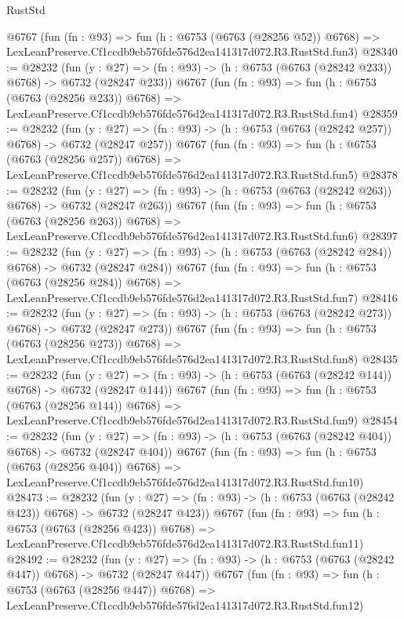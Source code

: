 \begin{lexlean}{RustStd}
\begin{coremodule}
    @6767
    (fun (fn : @93) =>
    fun (h : @6753 (@6763 (@28256 @52)) @6768) =>
    LexLeanPreserve.Cf1ccdb9eb576fde576d2ea141317d072.R3.RustStd.fun3)
@28340 := @28232
    (fun (y : @27) => (fn : @93) -> (h : @6753 (@6763 (@28242 @233)) @6768) -> @6732 (@28247 @233))
    @6767
    (fun (fn : @93) =>
    fun (h : @6753 (@6763 (@28256 @233)) @6768) =>
    LexLeanPreserve.Cf1ccdb9eb576fde576d2ea141317d072.R3.RustStd.fun4)
@28359 := @28232
    (fun (y : @27) => (fn : @93) -> (h : @6753 (@6763 (@28242 @257)) @6768) -> @6732 (@28247 @257))
    @6767
    (fun (fn : @93) =>
    fun (h : @6753 (@6763 (@28256 @257)) @6768) =>
    LexLeanPreserve.Cf1ccdb9eb576fde576d2ea141317d072.R3.RustStd.fun5)
@28378 := @28232
    (fun (y : @27) => (fn : @93) -> (h : @6753 (@6763 (@28242 @263)) @6768) -> @6732 (@28247 @263))
    @6767
    (fun (fn : @93) =>
    fun (h : @6753 (@6763 (@28256 @263)) @6768) =>
    LexLeanPreserve.Cf1ccdb9eb576fde576d2ea141317d072.R3.RustStd.fun6)
@28397 := @28232
    (fun (y : @27) => (fn : @93) -> (h : @6753 (@6763 (@28242 @284)) @6768) -> @6732 (@28247 @284))
    @6767
    (fun (fn : @93) =>
    fun (h : @6753 (@6763 (@28256 @284)) @6768) =>
    LexLeanPreserve.Cf1ccdb9eb576fde576d2ea141317d072.R3.RustStd.fun7)
@28416 := @28232
    (fun (y : @27) => (fn : @93) -> (h : @6753 (@6763 (@28242 @273)) @6768) -> @6732 (@28247 @273))
    @6767
    (fun (fn : @93) =>
    fun (h : @6753 (@6763 (@28256 @273)) @6768) =>
    LexLeanPreserve.Cf1ccdb9eb576fde576d2ea141317d072.R3.RustStd.fun8)
@28435 := @28232
    (fun (y : @27) => (fn : @93) -> (h : @6753 (@6763 (@28242 @144)) @6768) -> @6732 (@28247 @144))
    @6767
    (fun (fn : @93) =>
    fun (h : @6753 (@6763 (@28256 @144)) @6768) =>
    LexLeanPreserve.Cf1ccdb9eb576fde576d2ea141317d072.R3.RustStd.fun9)
@28454 := @28232
    (fun (y : @27) => (fn : @93) -> (h : @6753 (@6763 (@28242 @404)) @6768) -> @6732 (@28247 @404))
    @6767
    (fun (fn : @93) =>
    fun (h : @6753 (@6763 (@28256 @404)) @6768) =>
    LexLeanPreserve.Cf1ccdb9eb576fde576d2ea141317d072.R3.RustStd.fun10)
@28473 := @28232
    (fun (y : @27) => (fn : @93) -> (h : @6753 (@6763 (@28242 @423)) @6768) -> @6732 (@28247 @423))
    @6767
    (fun (fn : @93) =>
    fun (h : @6753 (@6763 (@28256 @423)) @6768) =>
    LexLeanPreserve.Cf1ccdb9eb576fde576d2ea141317d072.R3.RustStd.fun11)
@28492 := @28232
    (fun (y : @27) => (fn : @93) -> (h : @6753 (@6763 (@28242 @447)) @6768) -> @6732 (@28247 @447))
    @6767
    (fun (fn : @93) =>
    fun (h : @6753 (@6763 (@28256 @447)) @6768) =>
    LexLeanPreserve.Cf1ccdb9eb576fde576d2ea141317d072.R3.RustStd.fun12)

\end{coremodule}
\end{lexlean}
